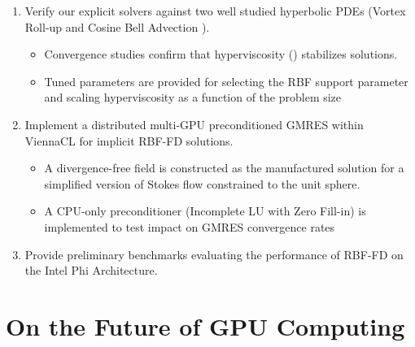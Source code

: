 \begin{enumerate}
\item Verify our explicit solvers against two well studied hyperbolic PDEs (Vortex Roll-up \cite{NairTransport05, NairJablonowski08} and Cosine Bell Advection \cite{JakobChien1995}).
\begin{itemize} 
\item Convergence studies confirm that hyperviscosity (\cite{Fornberg2011b}) stabilizes solutions.
\item Tuned parameters are provided for selecting the RBF support parameter and scaling hyperviscosity as a function of the problem size
\end{itemize}
\item Implement a distributed multi-GPU preconditioned GMRES within ViennaCL for implicit RBF-FD solutions.
\begin{itemize} 
\item A divergence-free field is constructed as the manufactured solution for a simplified version of Stokes flow constrained to the unit sphere. 
\item A CPU-only preconditioner (Incomplete LU with Zero Fill-in) is implemented to test impact on GMRES convergence rates 
\end{itemize}
\item Provide preliminary benchmarks evaluating the performance of RBF-FD on the Intel Phi Architecture. 
\end{enumerate}

\section{On the Future of GPU Computing}



%
%
%
%

